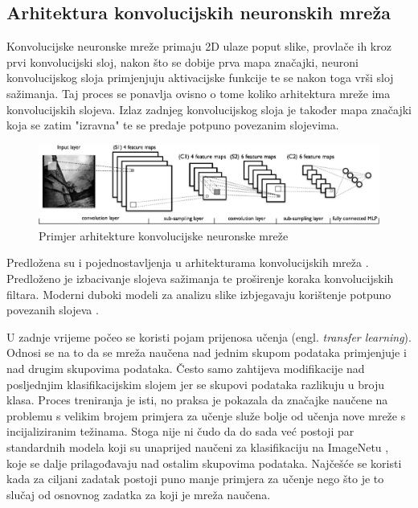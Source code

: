 \documentclass[times, utf8, diplomski]{fer}
\begin{document}
\subsection{Arhitektura konvolucijskih neuronskih mreža}
Konvolucijske neuronske mreže primaju 2D ulaze poput slike, provlače ih kroz prvi konvolucijski sloj, nakon što se dobije prva mapa značajki, neuroni konvolucijskog sloja primjenjuju aktivacijske funkcije te se nakon toga vrši sloj sažimanja. Taj proces se ponavlja ovisno o tome koliko arhitektura mreže ima konvolucijskih slojeva. Izlaz zadnjeg konvolucijskog sloja je također mapa značajki koja se zatim "izravna" te se predaje potpuno povezanim slojevima. \par

\begin{figure}[htbp]
    \centering
    \includegraphics[scale=0.75]{Slike/mylenet}
    \caption{Primjer arhitekture konvolucijske neuronske mreže \cite{mylenet}}
\end{figure}

Predložena su i pojednostavljenja u arhitekturama konvolucijskih mreža \cite{striving}. Predloženo je izbacivanje slojeva sažimanja te proširenje koraka konvolucijskih filtara. Moderni duboki modeli za analizu slike izbjegavaju korištenje potpuno povezanih slojeva \cite{fullyconv}. \par

U zadnje vrijeme počeo se koristi pojam prijenosa učenja (engl. \textit{transfer learning}). Odnosi se na to da se mreža naučena nad jednim skupom podataka primjenjuje i nad drugim skupovima podataka. Često samo zahtijeva modifikacije nad posljednjim klasifikacijskim slojem jer se skupovi podataka razlikuju u broju klasa. Proces treniranja je isti, no praksa je pokazala da značajke naučene na problemu s velikim brojem primjera za učenje služe bolje od učenja nove mreže s incijaliziranim težinama. Stoga nije ni čudo da do sada već postoji par standardnih modela koji su unaprijed naučeni za klasifikaciju na ImageNetu \cite{imagenet}, koje se dalje prilagođavaju nad ostalim skupovima podataka. Najčešće se koristi kada za ciljani zadatak postoji puno manje primjera za učenje nego što je to slučaj od osnovnog zadatka za koji je mreža naučena.
\end{document}
